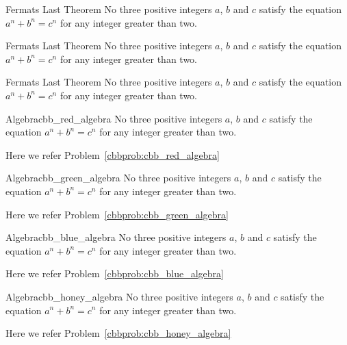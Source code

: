 \documentclass[11pt, letterpaper]{../src/exercise}
\begin{document}
    \begin{cbbhoney}{Fermats Last Theorem}
    No three positive integers \(a\), \(b\) and \(c\) satisfy the equation
    \(a^{n} + b^{n} = c^{n}\) for any integer greater than two.
    \end{cbbhoney}

    \begin{cbbpink}{Fermats Last Theorem}
    No three positive integers \(a\), \(b\) and \(c\) satisfy the equation
    \(a^{n} + b^{n} = c^{n}\) for any integer greater than two.
    \end{cbbpink}

    \begin{cbbpurple}{Fermats Last Theorem}
    No three positive integers \(a\), \(b\) and \(c\) satisfy the equation
    \(a^{n} + b^{n} = c^{n}\) for any integer greater than two.
    \end{cbbpurple}

    \begin{cbbredproblem}{Algebra}{cbb_red_algebra}
    No three positive integers \(a\), \(b\) and \(c\) satisfy the equation
    \(a^{n} + b^{n} = c^{n}\) for any integer greater than two.
    \end{cbbredproblem}
    Here we refer Problem~\ref{cbbprob:cbb_red_algebra}%

    \begin{cbbgreenproblem}{Algebra}{cbb_green_algebra}
    No three positive integers \(a\), \(b\) and \(c\) satisfy the equation
    \(a^{n} + b^{n} = c^{n}\) for any integer greater than two.
    \end{cbbgreenproblem}
    Here we refer Problem~\ref{cbbprob:cbb_green_algebra}

    \begin{cbbblueproblem}{Algebra}{cbb_blue_algebra}
    No three positive integers \(a\), \(b\) and \(c\) satisfy the equation
    \(a^{n} + b^{n} = c^{n}\) for any integer greater than two.
    \end{cbbblueproblem}
    Here we refer Problem~\ref{cbbprob:cbb_blue_algebra}

    \begin{cbbhoneyproblem}{Algebra}{cbb_honey_algebra}
    No three positive integers \(a\), \(b\) and \(c\) satisfy the equation
    \(a^{n} + b^{n} = c^{n}\) for any integer greater than two.
    \end{cbbhoneyproblem}
    Here we refer Problem~\ref{cbbprob:cbb_honey_algebra}
\end{document}

